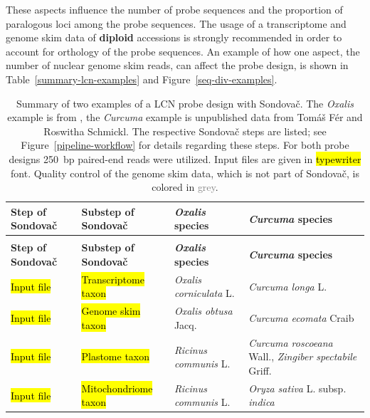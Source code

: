\documentclass[a4paper, 11pt, twoside]{article}
\renewcommand{\texttt}[1]{\hl{\ttfamily #1}}
\newcommand{\textgr}[1]{\textcolor{Grey}{#1}}
\begin{document}
These aspects influence the number of probe sequences and the proportion of paralogous loci among the probe sequences. The usage of a transcriptome and genome skim data of \textbf{diploid} accessions is strongly recommended in order to account for orthology of the probe sequences. An example of how one aspect, the number of nuclear genome skim reads, can affect the probe design, is shown in Table~\ref{summary-lcn-examples} and Figure~\ref{seq-div-examples}.

\begin{longtable}{ | >{\centering\arraybackslash}m{1.8cm} >{\centering\arraybackslash}m{6.5cm} >{\centering\arraybackslash}m{2.5cm} >{\centering\arraybackslash}m{3.4cm} |}
\caption[Summary of two examples of a LCN probe design with Sondovač.]{Summary of two examples of a LCN probe design with Sondovač. The \textit{Oxalis} example is from \citet{Schmickl2016}, the \textit{Curcuma} example is unpublished data from Tomáš Fér and Roswitha Schmickl. The respective Sondovač steps are listed; see Figure~\ref{pipeline-workflow} for details regarding these steps. For both probe designs 250~bp paired-end reads were utilized. Input files are given in \texttt{typewriter} font. Quality control of the genome skim data, which is not part of Sondovač, is colored in \textgr{grey}.}\\
\hline
\textbf{Step of Sondovač} & \textbf{Substep of Sondovač} & \textbf{\textit{Oxalis} species} & \textbf{\textit{Curcuma} species}\\
\endfirsthead %
\multicolumn{3}{@{}l}{\underline{\ldots~continued Table~\ref{summary-lcn-examples}.}}\\
\textbf{Step of Sondovač} & \textbf{Substep of Sondovač} & \textbf{\textit{Oxalis} species} & \textbf{\textit{Curcuma} species}\\
\endhead %
\hline
\endlastfoot
\texttt{Input file} & \texttt{Transcriptome taxon} & \textit{Oxalis corniculata} L. & \textit{Curcuma longa} L.\\
\texttt{Input file} & \texttt{Genome skim taxon} & \textit{Oxalis obtusa} Jacq. & \textit{Curcuma ecomata} Craib\\
\texttt{Input file} & \texttt{Plastome taxon} & \textit{Ricinus communis} L. & \textit{Curcuma roscoeana} Wall., \textit{Zingiber spectabile} Griff.\\
\texttt{Input file} & \texttt{Mitochondriome taxon} & \textit{Ricinus communis} L. & \textit{Oryza sativa} L. subsp. \textit{indica}\\

\end{longtable}
\end{document}
